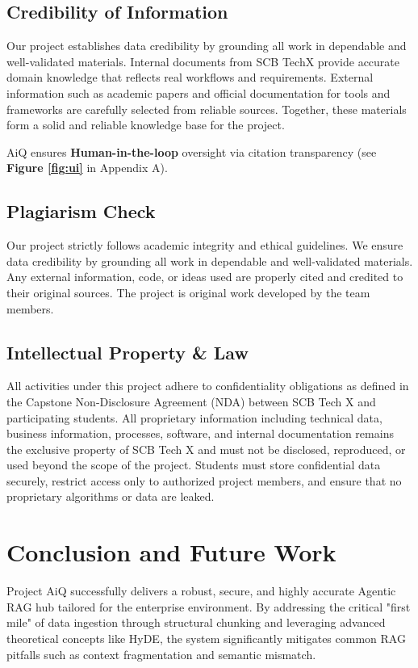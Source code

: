 \documentclass[12pt]{article}
\begin{document}
\subsection{Credibility of Information}
Our project establishes data credibility by grounding all work in dependable and well-validated materials. Internal documents from SCB TechX provide accurate domain knowledge that reflects real workflows and requirements. External information such as academic papers and official documentation for tools and frameworks are carefully selected from reliable sources. Together, these materials form a solid and reliable knowledge base for the project.

AiQ ensures \textbf{Human-in-the-loop} oversight via citation transparency (see \textbf{Figure \ref{fig:ui}} in Appendix A).

\subsection{Plagiarism Check}
Our project strictly follows academic integrity and ethical guidelines. We ensure data credibility by grounding all work in dependable and well-validated materials. Any external information, code, or ideas used are properly cited and credited to their original sources. The project is original work developed by the team members.

\subsection{Intellectual Property \& Law}
All activities under this project adhere to confidentiality obligations as defined in the Capstone Non-Disclosure Agreement (NDA) between SCB Tech X and participating students. All proprietary information including technical data, business information, processes, software, and internal documentation remains the exclusive property of SCB Tech X and must not be disclosed, reproduced, or used beyond the scope of the project. Students must store confidential data securely, restrict access only to authorized project members, and ensure that no proprietary algorithms or data are leaked.

\newpage
\section{Conclusion and Future Work}
Project AiQ successfully delivers a robust, secure, and highly accurate Agentic RAG hub tailored for the enterprise environment. By addressing the critical "first mile" of data ingestion through structural chunking and leveraging advanced theoretical concepts like HyDE, the system significantly mitigates common RAG pitfalls such as context fragmentation and semantic mismatch.
\end{document}
